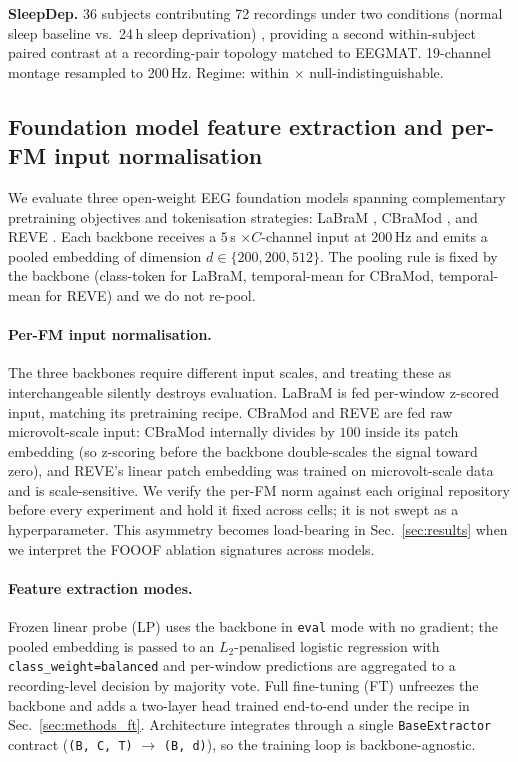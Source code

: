 \textbf{SleepDep.} 36 subjects contributing 72 recordings under two
conditions (normal sleep baseline vs.\ 24\,h sleep deprivation)
\citep{xiang2025sleepdep}, providing a second within-subject paired
contrast at a recording-pair topology matched to EEGMAT. 19-channel
montage resampled to 200\,Hz. Regime: within $\times$
null-indistinguishable.

\subsection{Foundation model feature extraction and per-FM input
normalisation} \label{sec:methods_fm}

We evaluate three open-weight EEG foundation models spanning
complementary pretraining objectives and tokenisation strategies:
LaBraM \citep{labram2024}, CBraMod \citep{cbramod2025}, and REVE
\citep{reve2025}. Each backbone receives a $5$\,s $\times C$-channel
input at 200\,Hz and emits a pooled embedding of dimension
$d \in \{200, 200, 512\}$. The pooling rule is fixed by the backbone
(class-token for LaBraM, temporal-mean for CBraMod, temporal-mean for
REVE) and we do not re-pool.

\paragraph{Per-FM input normalisation.} The three backbones require
different input scales, and treating these as interchangeable silently
destroys evaluation. LaBraM is fed per-window z-scored input, matching
its pretraining recipe. CBraMod and REVE are fed raw microvolt-scale
input: CBraMod internally divides by $100$ inside its patch embedding
(so z-scoring before the backbone double-scales the signal toward
zero), and REVE's linear patch embedding was trained on microvolt-scale
data and is scale-sensitive. We verify the per-FM norm against each
original repository before every experiment and hold it fixed across
cells; it is not swept as a hyperparameter. This asymmetry becomes
load-bearing in Sec.~\ref{sec:results} when we interpret the FOOOF
ablation signatures across models.

\paragraph{Feature extraction modes.} Frozen linear probe (LP) uses
the backbone in \texttt{eval} mode with no gradient; the pooled
embedding is passed to an $L_2$-penalised logistic regression with
\texttt{class\_weight=balanced} and per-window predictions are
aggregated to a recording-level decision by majority vote. Full
fine-tuning (FT) unfreezes the backbone and adds a two-layer head
trained end-to-end under the recipe in Sec.~\ref{sec:methods_ft}.
Architecture integrates through a single \texttt{BaseExtractor}
contract (\texttt{(B, C, T)} $\rightarrow$ \texttt{(B, d)}), so the
training loop is backbone-agnostic.

